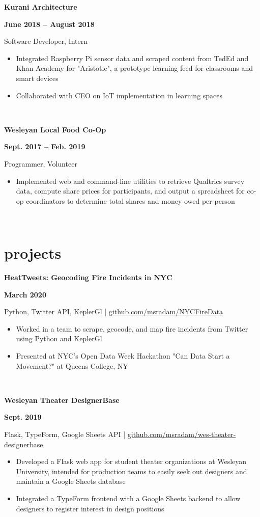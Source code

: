 \documentclass[letterpaper, 11pt]{article}
\newcommand{\expentry}[5]{

    \begin{minipage}[b]{0.5\textwidth}
        \raggedright
        \bf\large #3
        \end{minipage}%
        \begin{minipage}[b]{0.5\textwidth}
        \raggedleft
        \bf {#1} -- {#2}
        \end{minipage}

    \begin{minipage}[t]{\linewidth}
    \vspace{-3mm}
    #4
    \vspace{-1.75mm}
    \small{#5}
    \end{minipage}\\
    \vspace{1mm}
    }
\newcommand{\projectentry}[4]{

    \begin{minipage}[b]{0.5\textwidth}
        \raggedright
        \bf #2
        \end{minipage}%
        \begin{minipage}[b]{0.5\textwidth}
        \raggedleft
        \bf #1
        \end{minipage}

    \begin{minipage}[t]{\linewidth}
    \vspace{-3mm}
    \small #3
    \vspace{-1.75mm}
    \small{#4}
    \end{minipage}\\
    \vspace{1mm}
    }
\begin{document}
    \expentry{June 2018}
    {August 2018}
    {Kurani Architecture}
    {Software Developer, Intern}
    {\begin{itemize}
          \setlength\itemsep{-0.5mm}
          \item Integrated Raspberry Pi sensor data and scraped content from TedEd and Khan Academy for "Aristotle", a prototype learning feed for classrooms and smart devices
          \item Collaborated with CEO on IoT implementation in learning spaces 
        \end{itemize}
    }

    \expentry{Sept. 2017}
    {Feb. 2019}
    {Wesleyan Local Food Co-Op}
    {Programmer, Volunteer}
    {\begin{itemize}
          \setlength\itemsep{0.1mm}
          \item Implemented web and command-line utilities to retrieve Qualtrics survey data, compute share prices for participants, and output a spreadsheet for co-op coordinators to determine total shares and money owed per-person
        \end{itemize}
    }



    \section{projects}

        \projectentry{March 2020}
        {HeatTweets: Geocoding Fire Incidents in NYC}
        {Python, Twitter API, KeplerGl | \href{https://github.com/msradam/NYCFireData}{github.com/msradam/NYCFireData}}
        {\begin{itemize}
            \setlength\itemsep{-0.5mm}
            \item Worked in a team to scrape, geocode, and map fire incidents from Twitter using Python and KeplerGl
            \item Presented at NYC's Open Data Week Hackathon "Can Data Start a Movement?" at Queens College, NY
        \end{itemize}
        }

        \projectentry{Sept. 2019}
        {Wesleyan Theater DesignerBase}
        {Flask, TypeForm, Google Sheets API | \href{https://github.com/msradam/wes-theater-designerbase}{github.com/msradam/wes-theater-designerbase}}
        {\begin{itemize}
            \setlength\itemsep{-0.5mm}
            \item Developed a Flask web app for student theater organizations at Wesleyan University, intended for production teams to easily seek out designers and maintain a Google Sheets database
            \item Integrated a TypeForm frontend with a Google Sheets backend to allow designers to register interest in design positions
        \end{itemize}
        }
\end{document}
